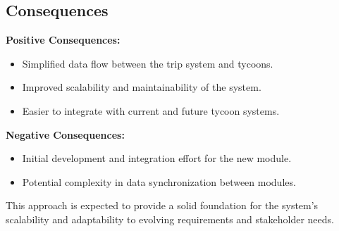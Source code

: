 \subsection*{Consequences}
\textbf{Positive Consequences:}
\begin{itemize}
    \item Simplified data flow between the trip system and tycoons.
    \item Improved scalability and maintainability of the system.
    \item Easier to integrate with current and future tycoon systems.
\end{itemize}
\textbf{Negative Consequences:}
\begin{itemize}
    \item Initial development and integration effort for the new module.
    \item Potential complexity in data synchronization between modules.
\end{itemize}
This approach is expected to provide a solid foundation for the system's scalability and adaptability to evolving requirements and stakeholder needs.